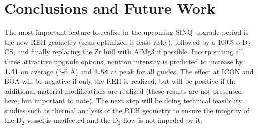 \documentclass[a4paper]{jpconf}
\begin{document}
%
%
%

\section{Conclusions and Future Work}

The most important feature to realize in the upcoming SINQ upgrade period is the new REH geometry (scan-optimized is least risky), followed by a 100\% o-D$_2$ CS, and finally replacing the Zr hull with AlMg3 if possible.  Incorporating all three attractive upgrade options, neutron intensity is predicted to increase by {\bf 1.41} on average (3-6 {\AA}) and {\bf 1.54} at peak for all guides.  The effect at ICON and BOA will be negative if only the REH is realized, but will be positive if the additional material modifications are realized (these results are not presented here, but important to note).  The next step will be doing technical feasibility studies such as thermal analysis of the REH geometry to ensure the integrity of the D$_2$ vessel is unaffected and the D$_2$ flow is not impeded by it.
\end{document}
